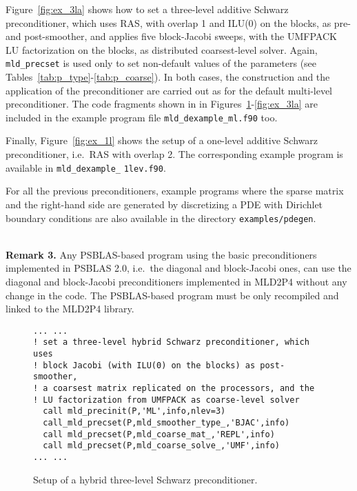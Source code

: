 Figure~\ref{fig:ex_3la} shows how to
set a three-level additive Schwarz preconditioner,
which uses RAS, with overlap 1 and ILU(0) on the blocks, 
as pre- and post-smoother, and applies five block-Jacobi sweeps, with
the UMFPACK LU factorization on the blocks, as distributed coarsest-level
solver. Again, \verb|mld_precset| is used only to set
non-default values of the parameters (see Tables~\ref{tab:p_type}-\ref{tab:p_coarse}).
In both cases, the construction and the application of the preconditioner
are carried out as for the default multi-level preconditioner.
The code fragments shown in in Figures~\ref{fig:ex_3lh}-\ref{fig:ex_3la} are
included in the example program file \verb|mld_dexample_ml.f90| too.

Finally, Figure~\ref{fig:ex_1l} shows the setup of a one-level
additive Schwarz preconditioner, i.e.\ RAS with overlap 2. The corresponding
example program is available in \verb|mld_dexample_| \verb|1lev.f90|.

For all the previous preconditioners, example programs where the sparse matrix and
the right-hand side are generated by discretizing a PDE with Dirichlet
boundary conditions are also available in the directory \verb|examples/pdegen|.

\ \\
\textbf{Remark 3.} Any PSBLAS-based program using the basic preconditioners
implemented in PSBLAS 2.0, i.e.\ the diagonal and block-Jacobi ones,
can use the diagonal and block-Jacobi preconditioners
implemented in MLD2P4 without any change in the code.
The PSBLAS-based program must be only recompiled
and linked to the MLD2P4 library.
\\


\begin{figure}[tbh]
\begin{center}
\begin{minipage}{.90\textwidth} 
{\small
\begin{verbatim}
... ...
! set a three-level hybrid Schwarz preconditioner, which uses 
! block Jacobi (with ILU(0) on the blocks) as post-smoother,
! a coarsest matrix replicated on the processors, and the 
! LU factorization from UMFPACK as coarse-level solver
  call mld_precinit(P,'ML',info,nlev=3)
  call_mld_precset(P,mld_smoother_type_,'BJAC',info)
  call mld_precset(P,mld_coarse_mat_,'REPL',info)
  call mld_precset(P,mld_coarse_solve_,'UMF',info)
... ...
\end{verbatim}
}
\end{minipage}

\caption{Setup of a hybrid three-level Schwarz preconditioner.\label{fig:ex_3lh}}
\end{center}
\end{figure}

